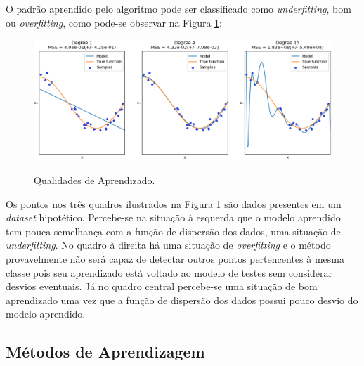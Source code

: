 O padrão aprendido pelo algoritmo pode ser classificado como \textit{underfitting}, bom ou \textit{overfitting}, como pode-se observar na Figura \ref{fig:scikit}:

\begin{figure}[H]
\centering
\caption{Qualidades de Aprendizado.} \includegraphics[width=15cm,height=\textwidth,keepaspectratio]{figs/treinamento_scikit.png}
\newline {}\label{fig:scikit}
\end{figure}

Os pontos nos três quadros ilustrados na Figura \ref{fig:scikit} são dados presentes em um \textit{dataset} hipotético. Percebe-se na situação à esquerda que o modelo aprendido tem pouca semelhança com a função de dispersão dos dados, uma situação de \textit{underfitting}. No quadro à direita há uma situação de \textit{overfitting} e o método provavelmente não será capaz de detectar outros pontos pertencentes à mesma classe pois seu aprendizado está voltado ao modelo de testes sem considerar desvios eventuais. Já no quadro central percebe-se uma situação de bom aprendizado uma vez que a função de dispersão dos dados possui pouco desvio do modelo aprendido.

\subsection{Métodos de Aprendizagem}

